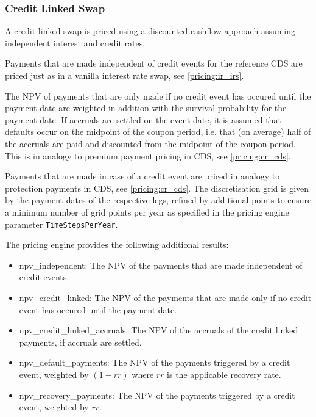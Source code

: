 \subsubsection{Credit Linked Swap}

A credit linked swap is priced using a discounted cashflow approach assuming independent interest and credit rates.

Payments that are made independent of credit events for the reference CDS are priced just as in a vanilla interest rate
swap, see \ref{pricing:ir_irs}.

The NPV of payments that are only made if no credit event has occured until the payment date are weighted in addition
with the survival probability for the payment date. If accruals are settled on the event date, it is assumed that
defaults occur on the midpoint of the coupon period, i.e. that (on average) half of the accruals are paid and discounted
from the midpoint of the coupon period. This is in analogy to premium payment pricing in CDS, see \ref{pricing:cr_cds}.

Payments that are made in case of a credit event are priced in analogy to protection payments in CDS, see
\ref{pricing:cr_cds}. The discretisation grid is given by the payment dates of the respective legs, refined by
additional points to ensure a minimum number of grid points per year as specified in the pricing engine parameter
\verb+TimeStepsPerYear+.

The pricing engine provides the following additional results:

\begin{itemize}
\item npv\_independent: The NPV of the payments that are made independent of credit events.
\item npv\_credit\_linked: The NPV of the payments that are made only if no credit event has occured until the payment date.
\item npv\_credit\_linked\_accruals: The NPV of the accruals of the credit linked payments, if accruals are settled.
\item npv\_default\_payments: The NPV of the payments triggered by a credit event, weighted by $(1-rr)$ where $rr$ is
  the applicable recovery rate.
\item npv\_recovery\_payments: The NPV of the payments triggered by a credit event, weighted by $rr$.
\end{itemize}